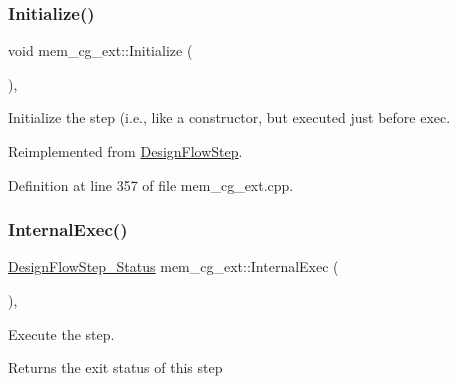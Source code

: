 \mbox{\label{classmem__cg__ext_a5899173716bbaa87a39603a1847f4ff6}} 
\subsubsection{\texorpdfstring{Initialize()}{Initialize()}}
{\footnotesize\ttfamily void mem\+\_\+cg\+\_\+ext\+::\+Initialize (\begin{DoxyParamCaption}{ }\end{DoxyParamCaption})\hspace{0.3cm}{\ttfamily [override]}, {\ttfamily [virtual]}}



Initialize the step (i.\+e., like a constructor, but executed just before exec. 



Reimplemented from \hyperlink{classDesignFlowStep_a44b50683382a094976e1d432a7784799}{Design\+Flow\+Step}.



Definition at line 357 of file mem\+\_\+cg\+\_\+ext.\+cpp.

\mbox{\label{classmem__cg__ext_aec306532229120aabaacf2a9602648c2}} 
\subsubsection{\texorpdfstring{Internal\+Exec()}{InternalExec()}}
{\footnotesize\ttfamily \hyperlink{design__flow__step_8hpp_afb1f0d73069c26076b8d31dbc8ebecdf}{Design\+Flow\+Step\+\_\+\+Status} mem\+\_\+cg\+\_\+ext\+::\+Internal\+Exec (\begin{DoxyParamCaption}{ }\end{DoxyParamCaption})\hspace{0.3cm}{\ttfamily [override]}, {\ttfamily [virtual]}}



Execute the step. 

\begin{DoxyReturn}{Returns}
the exit status of this step 
\end{DoxyReturn}


